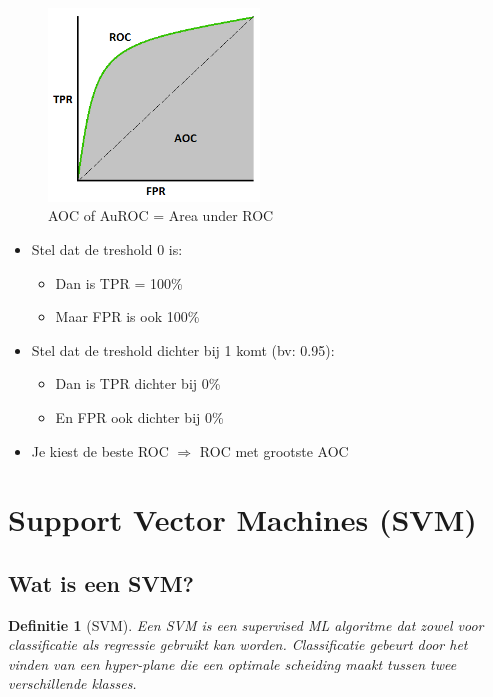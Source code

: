 \documentclass{article}
\newtheorem{theorem}{Definitie}[section]
\begin{document}
\begin{figure}[H]
    \centering
    \includegraphics[width=0.5\textwidth]{AuROC.png}
    \caption{AOC of AuROC = Area under ROC}
\end{figure}

\begin{itemize}
    \item Stel dat de treshold 0 is:
    \begin{itemize}
        \item Dan is TPR = 100\%
        \item Maar FPR is ook 100\%
    \end{itemize}
    \item Stel dat de treshold dichter bij 1 komt (bv: 0.95):
    \begin{itemize}
        \item Dan is TPR dichter bij 0\%
        \item En FPR ook dichter bij 0\%
    \end{itemize}
    \item Je kiest de beste ROC $\Rightarrow$ ROC met grootste AOC
\end{itemize}

\section{Support Vector Machines (SVM)}

\subsection{Wat is een SVM?}

\begin{theorem}[SVM]
Een SVM is een supervised ML algoritme dat zowel voor classificatie als regressie
gebruikt kan worden. Classificatie gebeurt door het vinden van een hyper-plane die
een optimale scheiding maakt tussen twee verschillende klasses.
\end{theorem}
\end{document}
